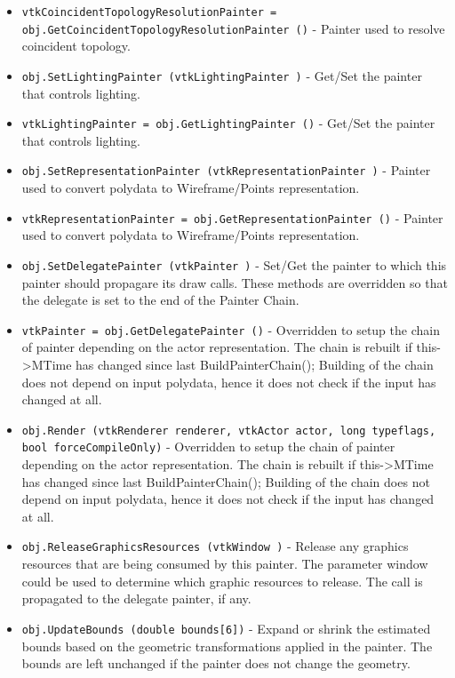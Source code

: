\begin{itemize}
\item  \verb|vtkCoincidentTopologyResolutionPainter = obj.GetCoincidentTopologyResolutionPainter ()| -  Painter used to resolve coincident topology.

\item  \verb|obj.SetLightingPainter (vtkLightingPainter )| -  Get/Set the painter that controls lighting.

\item  \verb|vtkLightingPainter = obj.GetLightingPainter ()| -  Get/Set the painter that controls lighting.

\item  \verb|obj.SetRepresentationPainter (vtkRepresentationPainter )| -  Painter used to convert polydata to Wireframe/Points representation.

\item  \verb|vtkRepresentationPainter = obj.GetRepresentationPainter ()| -  Painter used to convert polydata to Wireframe/Points representation.

\item  \verb|obj.SetDelegatePainter (vtkPainter )| -  Set/Get the painter to which this painter should propagare its draw calls.
 These methods are overridden so that the delegate is set
 to the end of the Painter Chain.

\item  \verb|vtkPainter = obj.GetDelegatePainter ()| -  Overridden to setup the chain of painter depending on the 
 actor representation. The chain is rebuilt if
 this->MTime has changed 
 since last BuildPainterChain();
 Building of the chain does not depend on input polydata,
 hence it does not check if the input has changed at all.

\item  \verb|obj.Render (vtkRenderer renderer, vtkActor actor, long typeflags, bool forceCompileOnly)| -  Overridden to setup the chain of painter depending on the 
 actor representation. The chain is rebuilt if
 this->MTime has changed 
 since last BuildPainterChain();
 Building of the chain does not depend on input polydata,
 hence it does not check if the input has changed at all.

\item  \verb|obj.ReleaseGraphicsResources (vtkWindow )| -  Release any graphics resources that are being consumed by this painter.
 The parameter window could be used to determine which graphic
 resources to release. 
 The call is propagated to the delegate painter, if any.

\item  \verb|obj.UpdateBounds (double bounds[6])| -  Expand or shrink the estimated bounds based on the geometric
 transformations applied in the painter. The bounds are left unchanged
 if the painter does not change the geometry.

\end{itemize}
